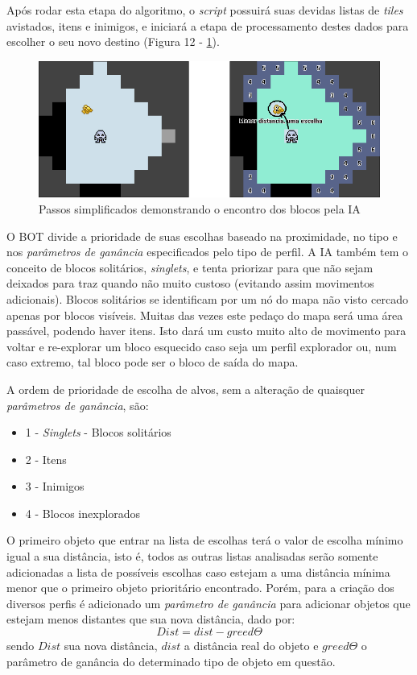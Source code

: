 Após rodar esta etapa do algoritmo, o \textit{script} possuirá suas devidas listas de \textit{tiles} avistados, itens e inimigos, e iniciará a etapa de processamento destes dados para escolher o seu novo destino (Figura 12 - \ref{fig12}). 

\begin{figure}[h]
	\centering
	\label{fig12}
		\includegraphics[keepaspectratio=true,scale=0.5]{figuras/fig12-bot.png}
	\caption{Passos simplificados demonstrando o encontro dos blocos pela IA}
\end{figure}

O BOT divide a prioridade de suas escolhas baseado na proximidade, no tipo e nos \textit{parâmetros de ganância} especificados pelo tipo de perfil. 
A IA também tem o conceito de blocos solitários, \textit{singlets}, e tenta priorizar para que não sejam deixados para traz quando não muito custoso (evitando assim movimentos adicionais). Blocos solitários se identificam por um nó do mapa não visto cercado apenas por blocos visíveis. Muitas das vezes este pedaço do mapa será uma área passável, podendo haver itens. Isto dará um custo muito alto de movimento para voltar e re-explorar um bloco esquecido caso seja um perfil explorador ou, num caso extremo, tal bloco pode ser o bloco de saída do mapa. 

A ordem de prioridade de escolha de alvos, sem a alteração de quaisquer \textit{parâmetros de ganância}, são:
\begin{itemize}
	\item 1 - \textit{Singlets} - Blocos solitários
	\item 2 - Itens 
	\item 3 - Inimigos
	\item 4 - Blocos inexplorados
\end{itemize}

O primeiro objeto que entrar na lista de escolhas terá o valor de escolha mínimo igual a sua distância, isto é, todos as outras listas analisadas serão somente adicionadas a lista de possíveis escolhas caso estejam a uma distância mínima menor que o primeiro objeto prioritário encontrado. Porém, para a criação dos diversos perfis é adicionado um \textit{parâmetro de ganância} para adicionar objetos que estejam menos distantes que sua nova distância, dado por:
\begin{equation}
\label{eqn01}
	Dist = dist - greed\Theta
\end{equation}
sendo $Dist$ sua nova distância, $dist$ a distância real do objeto e $greed\Theta$ o parâmetro de ganância do determinado tipo de objeto em questão.

